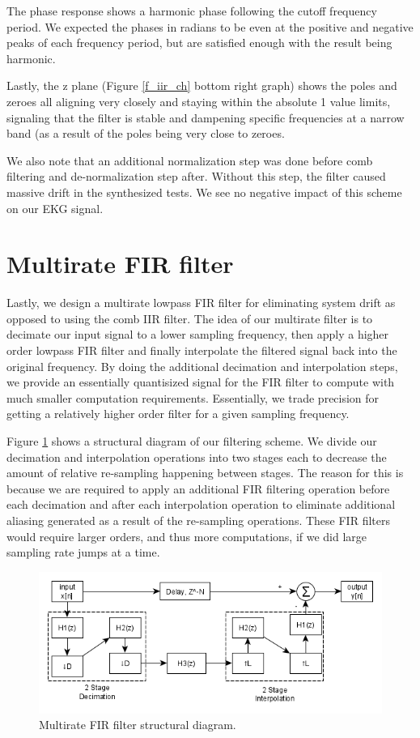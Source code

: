 \documentclass[10pt,a4paper,twocolumn]{article}
\begin{document}
The phase response shows a harmonic phase following the cutoff frequency period. We expected the phases in radians to be even at the positive and negative peaks of each frequency period, but are satisfied enough with the result being harmonic.

Lastly, the z plane (Figure \ref{f_iir_ch} bottom right graph) shows the poles and zeroes all aligning very closely and staying within the absolute 1 value limits, signaling that the filter is stable and dampening specific frequencies at a narrow band (as a result of the poles being very close to zeroes.

We also note that an additional normalization step was done before comb filtering and de-normalization step after. Without this step, the filter caused massive drift in the synthesized tests. We see no negative impact of this scheme on our EKG signal.


\section*{Multirate FIR filter}
Lastly, we design a multirate lowpass FIR filter \cite{multir} for eliminating system drift as opposed to using the comb IIR filter. The idea of our multirate filter is to decimate our input signal to a lower sampling frequency, then apply a higher order lowpass FIR filter and finally interpolate the filtered signal back into the original frequency. By doing the additional decimation and interpolation steps, we provide an essentially quantisized signal for the FIR filter to compute with much smaller computation requirements. Essentially, we trade precision for getting a relatively higher order filter for a given sampling frequency.

Figure \ref{f7} shows a structural diagram of our filtering scheme. We divide our decimation and interpolation operations into two stages each to decrease the amount of relative re-sampling happening between stages. The reason for this is because we are required to apply an additional FIR filtering operation before each decimation and after each interpolation operation to eliminate additional aliasing generated as a result of the re-sampling operations. These FIR filters would require larger orders, and thus more computations, if we did large sampling rate jumps at a time.

\begin{figure} %
	[!h]
	\centering
	\includegraphics*[width=.8\columnwidth]{multirate.png} %
	\caption{Multirate FIR filter structural diagram.}
	\label{f7}
	\vspace{6pt}
\end{figure}
\end{document}
